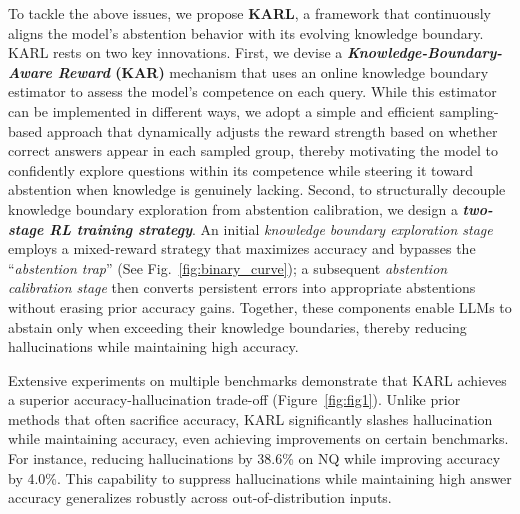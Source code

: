 \documentclass{article} %
\newcommand{\rewardname}{\textsc{KAR}}
\newcommand{\framename}{\textsc{KARL}}
\begin{document}
To tackle the above issues, we propose \textbf{\framename{}}, a framework that continuously aligns the model's abstention behavior with its evolving knowledge boundary.
\framename{} rests on two key innovations. 
First, we devise a \textbf{\textit{Knowledge-Boundary-Aware Reward} (\rewardname{})} mechanism that uses an online knowledge boundary estimator to assess the model’s competence on each query. While this estimator can be implemented in different ways, we adopt a simple and efficient sampling-based approach that dynamically adjusts the reward strength based on whether correct answers appear in each sampled group, thereby motivating the model to confidently explore questions within its competence while steering it toward abstention when knowledge is genuinely lacking.
Second, to structurally decouple knowledge boundary exploration from abstention calibration, we design a \textbf{\textit{two-stage RL training strategy}}. An initial \textit{knowledge boundary exploration stage} employs a mixed-reward strategy that maximizes accuracy and bypasses the ``\textit{abstention trap}'' (See Fig.~\ref{fig:binary_curve}); a subsequent \textit{abstention calibration stage} then converts persistent errors into appropriate abstentions without erasing prior accuracy gains. Together, these components enable LLMs to abstain only when exceeding their knowledge boundaries, thereby reducing hallucinations while maintaining high accuracy.

Extensive experiments on multiple benchmarks demonstrate that \framename{} achieves a superior accuracy-hallucination trade-off (Figure~\ref{fig:fig1}).
Unlike prior methods that often sacrifice accuracy, \framename{} significantly slashes hallucination while maintaining accuracy, even achieving improvements on certain benchmarks. For instance, reducing hallucinations by 38.6\% on NQ while improving accuracy by 4.0\%.
This capability to suppress hallucinations while maintaining high answer accuracy generalizes robustly across out-of-distribution inputs.
\end{document}

